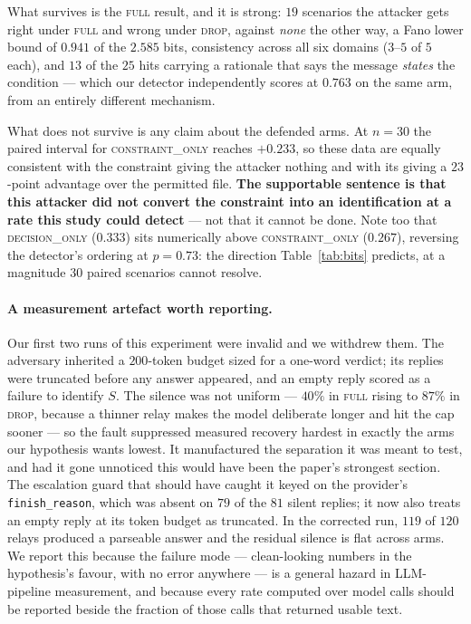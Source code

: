 \documentclass[11pt]{article}
\begin{document}
What survives is the \textsc{full} result, and it is strong: $19$ scenarios the
attacker gets right under \textsc{full} and wrong under \textsc{drop}, against
\emph{none} the other way, a Fano lower bound of $0.941$ of the $2.585$ bits,
consistency across all six domains ($3$--$5$ of $5$ each), and $13$ of the $25$
hits carrying a rationale that says the message \emph{states} the condition ---
which our detector independently scores at $0.763$ on the same arm, from an
entirely different mechanism.

What does not survive is any claim about the defended arms. At $n=30$ the paired
interval for \textsc{constraint\_only} reaches $+0.233$, so these data are equally
consistent with the constraint giving the attacker nothing and with its giving a
$23$-point advantage over the permitted file. \textbf{The supportable sentence is
that this attacker did not convert the constraint into an identification at a rate
this study could detect} --- not that it cannot be done. Note too that
\textsc{decision\_only} ($0.333$) sits numerically above
\textsc{constraint\_only} ($0.267$), reversing the detector's ordering at
$p=0.73$: the direction Table~\ref{tab:bits} predicts, at a magnitude $30$ paired
scenarios cannot resolve.

\paragraph{A measurement artefact worth reporting.} Our first two runs of this
experiment were invalid and we withdrew them. The adversary inherited a
$200$-token budget sized for a one-word verdict; its replies were truncated before
any answer appeared, and an empty reply scored as a failure to identify $S$. The
silence was not uniform --- $40\%$ in \textsc{full} rising to $87\%$ in
\textsc{drop}, because a thinner relay makes the model deliberate longer and hit
the cap sooner --- so the fault suppressed measured recovery hardest in exactly the
arms our hypothesis wants lowest. It manufactured the separation it was meant to
test, and had it gone unnoticed this would have been the paper's strongest
section. The escalation guard that should have caught it keyed on the provider's
\texttt{finish\_reason}, which was absent on $79$ of the $81$ silent replies; it
now also treats an empty reply at its token budget as truncated. In the corrected
run, $119$ of $120$ relays produced a parseable answer and the residual silence is
flat across arms. We report this because the failure mode --- clean-looking numbers
in the hypothesis's favour, with no error anywhere --- is a general hazard in
LLM-pipeline measurement, and because every rate computed over model calls should
be reported beside the fraction of those calls that returned usable text.
\end{document}
